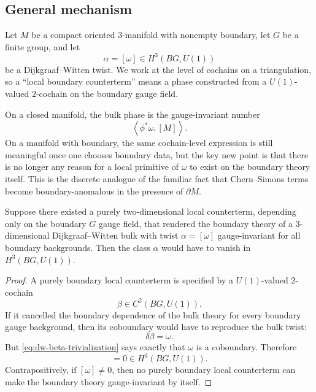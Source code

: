 \subsection{General mechanism}

\begin{assumption}\label{ass:dw-boundary}
Let $M$ be a compact oriented $3$-manifold with nonempty boundary, let $G$ be a finite group, and let
\begin{equation*}
\alpha=[\omega]\in H^3(BG,U(1))
\end{equation*}
be a Dijkgraaf--Witten twist. We work at the level of cochains on a triangulation, so a ``local boundary counterterm'' means a phase constructed from a $U(1)$-valued $2$-cochain on the boundary gauge field.
\end{assumption}

\noindent On a closed manifold, the bulk phase is the gauge-invariant number
\begin{equation*}
\left\langle \phi^*\omega,[M]\right\rangle.
\end{equation*}
On a manifold with boundary, the same cochain-level expression is still meaningful once one chooses boundary data, but the key new point is that there is no longer any reason for a local primitive of $\omega$ to exist on the boundary theory itself. This is the discrete analogue of the familiar fact that Chern--Simons terms become boundary-anomalous in the presence of $\partial M$.

\begin{proposition}\label{prop:dw-boundary-obstruction}
Suppose there existed a purely two-dimensional local counterterm, depending only on the boundary $G$ gauge field, that rendered the boundary theory of a $3$-dimensional Dijkgraaf--Witten bulk with twist $\alpha=[\omega]$ gauge-invariant for all boundary backgrounds. Then the class $\alpha$ would have to vanish in $H^3(BG,U(1))$.
\end{proposition}

\begin{proof}
A purely boundary local counterterm is specified by a $U(1)$-valued $2$-cochain
\begin{equation*}
\beta \in C^2(BG,U(1)).
\end{equation*}
If it cancelled the boundary dependence of the bulk theory for every boundary gauge background, then its coboundary would have to reproduce the bulk twist:
\begin{equation}\label{eq:dw-beta-trivialization}
\delta \beta = \omega.
\end{equation}
But \eqref{eq:dw-beta-trivialization} says exactly that $\omega$ is a coboundary. Therefore
\begin{equation*}
[\omega]=0\in H^3(BG,U(1)).
\end{equation*}
Contrapositively, if $[\omega]\neq 0$, then no purely boundary local counterterm can make the boundary theory gauge-invariant by itself.
\end{proof}

